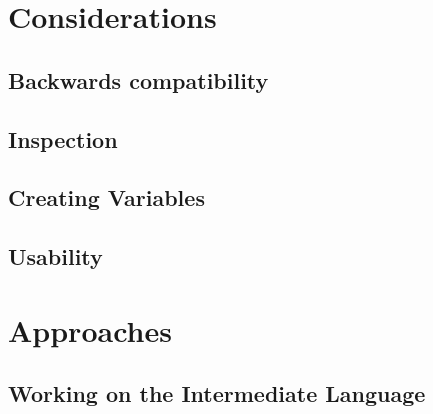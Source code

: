 %

\section{Considerations}

\subsection{Backwards compatibility}

\subsection{Inspection}

\subsection{Creating Variables}
%

\subsection{Usability}

\section{Approaches}

\subsection{Working on the Intermediate Language}


